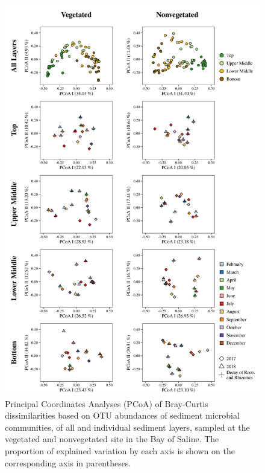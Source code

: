 \documentclass[12pt,]{article}
\begin{document}
\begin{figure}[H]

{\centering \includegraphics[width=0.8\linewidth]{../results/figures/pcoa_figure_areas_layers} 

}

\caption{Principal Coordinates Analyses (PCoA) of Bray-Curtis dissimilarities based on OTU abundances of sediment microbial communities, of all and individual sediment layers, sampled at the vegetated and nonvegetated site in the Bay of Saline. The proportion of explained variation by each axis is shown on the corresponding axis in parentheses.\label{pcoa_figure_areas_layers}}\label{fig:unnamed-chunk-4}
\end{figure}
\end{document}
